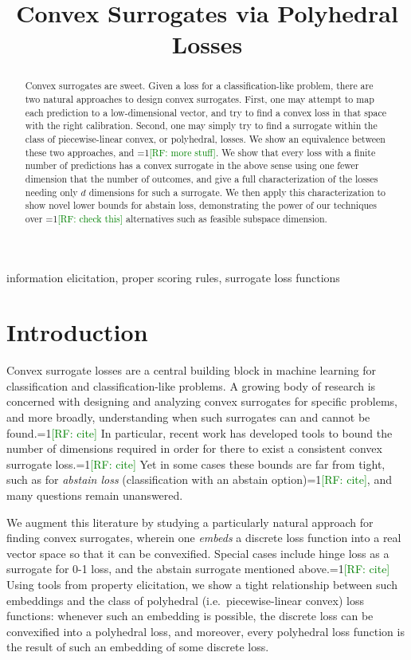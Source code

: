 \documentclass[anon,12pt]{colt2019}
\title{Convex Surrogates via Polyhedral Losses}
\newcommand{\Comments}{1}
\newcommand{\mynote}[2]{\ifnum\Comments=1\textcolor{#1}{#2}\fi}
\newcommand{\raf}[1]{\mynote{green}{[RF: #1]}}
\begin{document}
\maketitle

\begin{abstract}
  Convex surrogates are sweet.
  Given a loss for a classification-like problem, there are two natural approaches to design convex surrogates.
  First, one may attempt to map each prediction to a low-dimensional vector, and try to find a convex loss in that space with the right calibration.
  Second, one may simply try to find a surrogate within the class of piecewise-linear convex, or polyhedral, losses.
  We show an equivalence between these two approaches, and \raf{more stuff}.
  We show that every loss with a finite number of predictions has a convex surrogate in the above sense using one fewer dimension that the number of outcomes, and give a full characterization of the losses needing only $d$ dimensions for such a surrogate.
  We then apply this characterization to show novel lower bounds for abstain loss, demonstrating the power of our techniques over \raf{check this} alternatives such as feasible subspace dimension.
\end{abstract}
\begin{keywords}%
  information elicitation, proper scoring rules, surrogate loss functions
\end{keywords}

\section{Introduction}\label{sec:intro}

Convex surrogate losses are a central building block in machine learning for classification and classification-like problems.
A growing body of research is concerned with designing and analyzing convex surrogates for specific problems, and more broadly, understanding when such surrogates can and cannot be found.\raf{cite}
In particular, recent work has developed tools to bound the number of dimensions required in order for there to exist a consistent convex surrogate loss.\raf{cite}
Yet in some cases these bounds are far from tight, such as for \emph{abstain loss} (classification with an abstain option)\raf{cite}, and many questions remain unanswered.

We augment this literature by studying a particularly natural approach for finding convex surrogates, wherein one \emph{embeds} a discrete loss function into a real vector space so that it can be convexified.
Special cases include hinge loss as a surrogate for 0-1 loss, and the abstain surrogate mentioned above.\raf{cite}
Using tools from property elicitation, we show a tight relationship between such embeddings and the class of polyhedral (i.e.\ piecewise-linear convex) loss functions: whenever such an embedding is possible, the discrete loss can be convexified into a polyhedral loss, and moreover, every polyhedral loss function is the result of such an embedding of some discrete loss.
\end{document}
